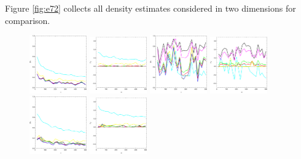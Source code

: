 \documentclass[
twoside,
openright,
titlepage,
numbers=noenddot,
headinclude,%
footinclude=true,
dottedtoc, %
ngerman,
american, %
pagesize=pdftex,
]{book}
\begin{document}
	\begin{example}
		Figure \ref{fig:e72} collects all density estimates considered in two dimensions for comparison. 
		\begin{figure}[H]
			\centering
			\captionsetup{width=0.95\textwidth}
			\includegraphics[width=0.22\textwidth]{figures/2DTVexamples/alln1}
			\includegraphics[width=0.22\textwidth]{figures/2DTVexamples/alln2}
			\includegraphics[width=0.22\textwidth]{figures/2DTVexamples/allt1}
			\includegraphics[width=0.22\textwidth]{figures/2DTVexamples/allt2}
			\includegraphics[width=0.22\textwidth]{figures/2DTVexamples/alll1}
			\includegraphics[width=0.22\textwidth]{figures/2DTVexamples/alll2}

\end{figure}
\end{example}
\end{document}
